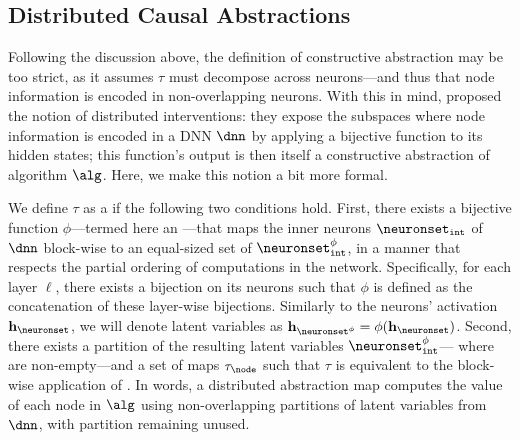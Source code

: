\documentclass{article}
\newcommand{\R}{\mathbb{R}}
\newcommand{\nodevalue}{v}
\newcommand{\layer}{\ell}
\newcommand{\hiddenstates}{\mathbf{h}}
\newcommand{\causalmap}{\phi}
\newcommand{\abstractionmap}{\tau}
\begin{document}
\subsection{Distributed Causal Abstractions}

Following the discussion above, the definition of constructive abstraction may be too strict, as it assumes $\abstractionmap$ must decompose across neurons---and thus that node information is encoded in non-overlapping neurons.
With this in mind, \citet{Geiger2023CausalAA,Geiger2023FindingAB} proposed the notion of distributed interventions: they expose the subspaces where node information is encoded in a DNN $\dnn$ by applying a bijective function to its hidden states; this function's output is then itself a constructive abstraction of algorithm $\alg$.
Here, we make this notion a bit more formal.

We define $\abstractionmap$ as a  if the following two conditions hold.
First, there exists a bijective function $\causalmap$---termed here an ---that maps the inner neurons $\neuronsetint$ of $\dnn$ block-wise to an equal-sized set of  $\neuronsetintcausal$, in a manner that respects the partial ordering of computations in the network. 
Specifically, for each layer $\ell$, there exists a bijection \smash{$\causalmap_{\layer}: \R^{\layerdim{\layer}} \to \R^{\layerdim{\layer}}$} on its neurons such that $\causalmap$ is defined as the concatenation of these layer-wise bijections.
Similarly to the neurons' activation $\hiddenstates_{\neuronset}$, we will denote latent variables as $\hiddenstates_{\neuronset^{\causalmap}} = \causalmap(\hiddenstates_{\neuronset})$.
Second, there exists a partition  
\smash{$\{\neuronset^{\causalmap}_{\node} \mid \node \in \nodesint\} \cup \{\neuronset^{\causalmap}_{\uselesspartition}\}$} of the resulting latent variables  $\neuronsetintcausal$--- where \smash{$\neuronset^{\causalmap}_{\node}$} are non-empty---and a set of maps $\abstractionmap_{\node}$ such that
$\abstractionmap$ is equivalent to the block-wise application of \smash{$\abstractionmap_{\node}(\hiddenstates_{\neuronset^{\causalmap}_{\node}})$}.
In words, a distributed abstraction map computes the value \smash{$\nodevalue_{\node}$} of each node \smash{$\node \in \nodesint$} in $\alg$ using non-overlapping partitions of latent variables \smash{$\neuronset^{\causalmap}_{\node}$} from $\dnn$, with partition \smash{$\neuronset^{\causalmap}_{\uselesspartition}$} remaining unused.
\end{document}
